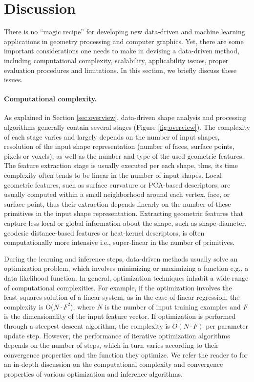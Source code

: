 

\section{Discussion}
\label{sec:conclusion}
There is no ``magic recipe'' for developing new data-driven and machine learning
applications in geometry processing and computer graphics. Yet, there are some important considerations one needs to make in devising a data-driven method, including computational complexity, scalability, applicability issues, proper
evaluation procedures and
limitations. In this section, we briefly discuss these issues.%


\paragraph*{Computational complexity.}
As explained in Section \ref{sec:overview}, data-driven shape analysis and processing algorithms generally contain several stages (Figure \ref{fig:overview}). The complexity of each stage varies and largely depends on the number of input shapes, resolution of the input shape representation (number of faces, surface points, pixels or voxels), as well as the number and type of the used geometric features. The feature extraction stage is usually executed per each shape, thus, its time complexity often tends to be linear in the number of input shapes. Local geometric features, such as surface curvature or PCA-based descriptors, are usually computed within a small neighborhood around each vertex, face, or surface point, thus their extraction depends linearly on the number of these primitives in the input shape representation. Extracting geometric features that capture less local or global information about the shape, such as shape diameter, geodesic distance-based features or heat-kernel descriptors, is often computationally more intensive i.e., super-linear in the number of primitives.

During the learning and inference steps, data-driven methods usually solve an optimization problem, which involves minimizing or maximizing a function e.g., a data likelihood function. In general, optimization techniques inhabit a wide range of computational complexities. For example, if the optimization involves the least-squares solution of a linear system, as in the case of linear regression, the complexity is O($N \cdot F^2$), where $N$ is the number of input training examples and $F$ is the dimensionality of the input feature vector. If optimization is performed through a steepest descent algorithm, the complexity is $O(N \cdot F)$ per parameter update step. However, the performance of iterative optimization algorithms depends on the number of steps, which in turn varies according to their convergence properties and the function they optimize. We refer the reader to \cite{Nocedal:2006:NO,Koller:2009:PGM,Solomon:2015:NA} for an in-depth discussion on the computational complexity and convergence properties of various optimization and inference algorithms.



